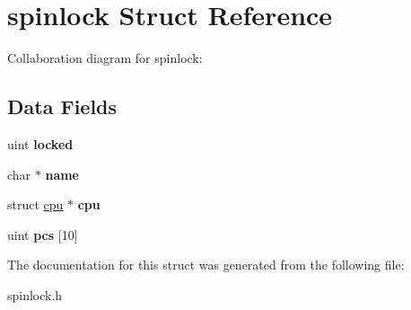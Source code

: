 \hypertarget{structspinlock}{}\section{spinlock Struct Reference}
\label{structspinlock}


Collaboration diagram for spinlock\+:
\subsection*{Data Fields}
\begin{DoxyCompactItemize}
\item 
uint {\bfseries locked}\hypertarget{structspinlock_a48f3007579f644934d9aba91e5378c03}{}\label{structspinlock_a48f3007579f644934d9aba91e5378c03}

\item 
char $\ast$ {\bfseries name}\hypertarget{structspinlock_afbec3274bf8ad9c421695a22f8d9d584}{}\label{structspinlock_afbec3274bf8ad9c421695a22f8d9d584}

\item 
struct \hyperlink{structcpu}{cpu} $\ast$ {\bfseries cpu}\hypertarget{structspinlock_a290ae772c8ccb9e8c1580204c31a7f88}{}\label{structspinlock_a290ae772c8ccb9e8c1580204c31a7f88}

\item 
uint {\bfseries pcs} \mbox{[}10\mbox{]}\hypertarget{structspinlock_ac9ef3f16f664094198af0b9063e23fe0}{}\label{structspinlock_ac9ef3f16f664094198af0b9063e23fe0}

\end{DoxyCompactItemize}


The documentation for this struct was generated from the following file\+:\begin{DoxyCompactItemize}
\item 
spinlock.\+h\end{DoxyCompactItemize}
